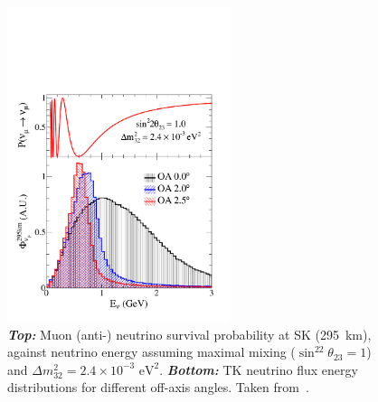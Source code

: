 \begin{figure}[ht]
  \begin{center}
    \includegraphics[keepaspectratio=true,width=0.58\textwidth]{images/t2k/oaeffect_flux.pdf}
    \caption[Muon neutrino survival probability assuming maximal
    mixing and $\Delta m^2_{32}=2.4\times 10^{-3}\text{~eV}^2$ at
    SK. Neutrino flux energy distribution for different off-axis at
    295~km]{\textbf{\textit{Top:}} Muon (anti-) neutrino survival
      probability at \Gls{SK} (295~km), against neutrino energy
      assuming maximal mixing ($\sin^22\theta_{23} = 1$) and
      $\Delta m^2_{32}=2.4\times
      10^{-3}\text{~eV}^2$. \textbf{\textit{Bottom:}} \Gls{TK}
      neutrino flux energy distributions for different off-axis
      angles. Taken from~\cite{FluxT2K2013}.}
    \label{fig:oaeffect}
  \end{center}
\end{figure}


